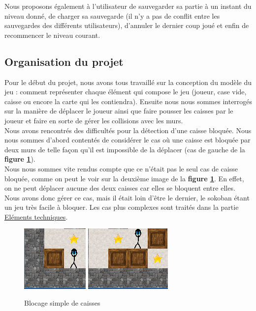 \documentclass[a4paper,12pt]{article} %
\begin{document}
Nous proposons également à l'utilisateur de sauvegarder sa partie à un instant du niveau donné, de charger sa sauvegarde (il n'y a pas de conflit entre les sauvegardes des différents utilisateurs), d'annuler le dernier coup joué  et enfin de recommencer le niveau courant.

\subsection{Organisation du projet}

Pour le début du projet, nous avons tous travaillé sur la conception du modèle du jeu : comment représenter chaque élément qui compose le jeu (joueur, case vide, caisse ou encore la carte qui les contiendra). Ensuite nous nous sommes interrogés sur la manière de déplacer le joueur ainsi que faire pousser les caisses par le joueur et faire en sorte de gérer les collisions avec les murs.\\
Nous avons rencontrés des difficultés pour la détection d'une caisse bloquée. Nous nous sommes d'abord contentés de considérer le cas où une caisse est bloquée par deux murs de telle façon qu'il est impossible de la déplacer (cas de gauche de la \textbf{figure \ref{figure4}}).\\
Nous nous sommes vite rendus compte que ce n'était pas le seul cas de caisse bloquée, comme on peut le voir sur la deuxième image de la \textbf{figure \ref{figure4}}. En effet, on ne peut déplacer aucune des deux caisses car elles se bloquent entre elles. Nous avons donc gérer ce cas, mais il était loin d'être le dernier, le sokoban étant un jeu très facile à bloquer. Les cas plus complexes sont traités dans la partie \hyperref[et]{Eléments techniques}.

\begin{figure}[!h]
\centering
\includegraphics[scale=0.5]{images/Capture3.PNG}
\hspace{1cm}
\includegraphics[scale=0.5]{images/Capture4.PNG}
\caption{Blocage simple de caisses}
\label{figure4}
\end{figure}
\end{document}
